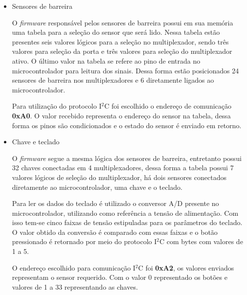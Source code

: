 \begin{itemize}
    \item Sensores de barreira
    
    O \textit{firmware} responsável pelos sensores de barreira possui em sua memória uma tabela para a seleção do sensor que será lido. Nessa tabela estão presentes seis valores lógicos para a seleção no multiplexador, sendo três valores para seleção da porta e três valores para seleção do multiplexador ativo. O último valor na tabela se refere ao pino de entrada no microcontrolador para leitura dos sinais. Dessa forma estão posicionados 24 sensores de barreira nos multiplexadores e 6 diretamente ligados ao microcontrolador.
    
    Para utilização do protocolo I$^2$C foi escolhido o endereço de comunicação \textbf{0xA0}. O valor recebido representa o endereço do sensor na tabela, dessa forma os pinos são condicionados e o estado do sensor é enviado em retorno.
    
    \item Chave e teclado
    
    O \textit{firmware} segue a mesma lógica dos sensores de barreira, entretanto possui 32 chaves conectadas em 4 multiplexadores, dessa forma a tabela possui 7 valores lógicos de seleção do multiplexador, há dois sensores conectados diretamente ao microcontrolador, uma chave e o teclado.
    
    Para ler os dados do teclado é utilizado o conversor A/D presente no microcontrolador, utilizando como referência a tensão de alimentação. Com isso tem-se cinco faixas de tensão estipuladas para os parâmetros do teclado. O valor obtido da conversão é comparado com essas faixas e o botão pressionado é retornado por meio do protocolo I$^2$C com bytes com valores de 1 a 5.
    
    O endereço escolhido para comunicação I$^2$C foi \textbf{0xA2}, os valores enviados representam o sensor requerido. Com o valor 0 representado os botões e valores de 1 a 33 representando as chaves. 
\end{itemize}

